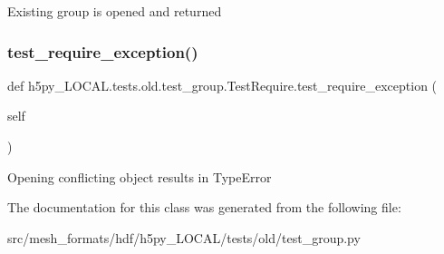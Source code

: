 \begin{DoxyVerb}Existing group is opened and returned \end{DoxyVerb}
 \mbox{\label{classh5py__LOCAL_1_1tests_1_1old_1_1test__group_1_1TestRequire_a0efeed3bfbd45601a631dd9b98f9c3e9}} 
\subsubsection{\texorpdfstring{test\+\_\+require\+\_\+exception()}{test\_require\_exception()}}
{\footnotesize\ttfamily def h5py\+\_\+\+L\+O\+C\+A\+L.\+tests.\+old.\+test\+\_\+group.\+Test\+Require.\+test\+\_\+require\+\_\+exception (\begin{DoxyParamCaption}\item[{}]{self }\end{DoxyParamCaption})}

\begin{DoxyVerb}Opening conflicting object results in TypeError \end{DoxyVerb}
 

The documentation for this class was generated from the following file\+:\begin{DoxyCompactItemize}
\item 
src/mesh\+\_\+formats/hdf/h5py\+\_\+\+L\+O\+C\+A\+L/tests/old/test\+\_\+group.\+py\end{DoxyCompactItemize}
